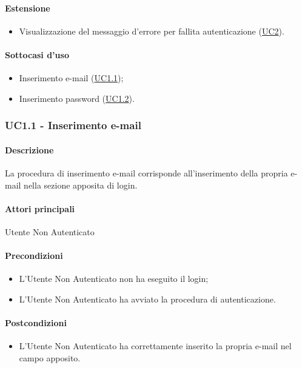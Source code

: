 \paragraph*{Estensione}
\begin{itemize}
  \item Visualizzazione del messaggio d’errore per fallita autenticazione (\hyperref[UC2]{UC2}).
\end{itemize}

\paragraph*{Sottocasi d'uso}
\begin{itemize}
  \item Inserimento e-mail (\hyperref[UC1point1]{UC1.1});
  \item Inserimento password (\hyperref[UC1point2]{UC1.2}).
\end{itemize}


\subsubsection{UC1.1 - Inserimento e-mail}\label{UC1point1}
\paragraph*{Descrizione}
La procedura di inserimento e-mail corrisponde all’inserimento della propria e-mail nella sezione apposita di login.

\paragraph*{Attori principali} Utente Non Autenticato

\paragraph*{Precondizioni}
\begin{itemize}
  \item L’Utente Non Autenticato non ha eseguito il login;
  \item L’Utente Non Autenticato ha avviato la procedura di autenticazione.  
\end{itemize}

\paragraph*{Postcondizioni}
\begin{itemize}
  \item L’Utente Non Autenticato ha correttamente inserito la propria e-mail nel campo apposito.
\end{itemize}

